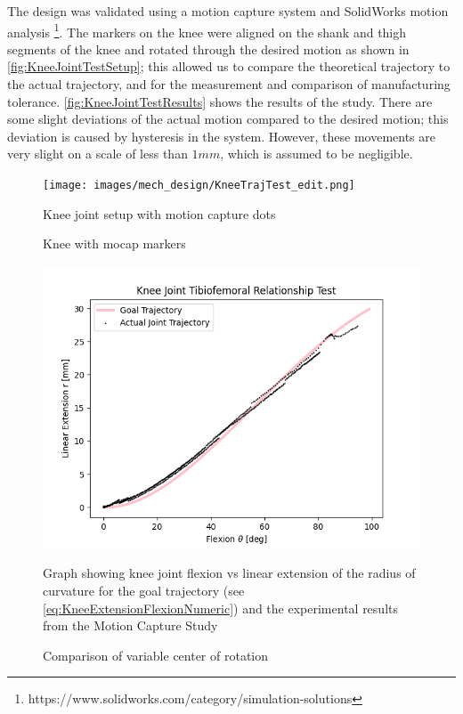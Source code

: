 The design was validated using a motion capture system and SolidWorks motion analysis \footnote{https://www.solidworks.com/category/simulation-solutions}. The markers on the knee were aligned on the shank and thigh segments of the knee and rotated through the desired motion as shown in \autoref{fig:KneeJointTestSetup}; this allowed us to compare the theoretical trajectory to the actual trajectory, and for the measurement and comparison of manufacturing tolerance. \autoref{fig:KneeJointTestResults} shows the results of the study. There are some slight deviations of the actual motion compared to the desired motion; this deviation is caused by hysteresis in the system. However, these movements are very slight on a scale of less than $1mm$, which is assumed to be negligible.   



\begin{figure}[ht!]
    \centering
    \texttt{[image: images/mech\_design/KneeTrajTest\_edit.png]}
    \caption{Knee with mocap markers}{Knee joint setup with motion capture dots}
    \label{fig:KneeJointTestSetup}
\end{figure}

\begin{figure}[ht!]
    \centering
    \includegraphics[scale=0.75]{images/mech_design/FlexionExtensionKneeJoint.png}
    \caption{Comparison of variable center of rotation}{Graph showing knee joint flexion vs linear extension of the radius of curvature for the goal trajectory (see \autoref{eq:KneeExtensionFlexionNumeric}) and the experimental results from the Motion Capture Study}
    \label{fig:KneeJointTestResults}
\end{figure}



